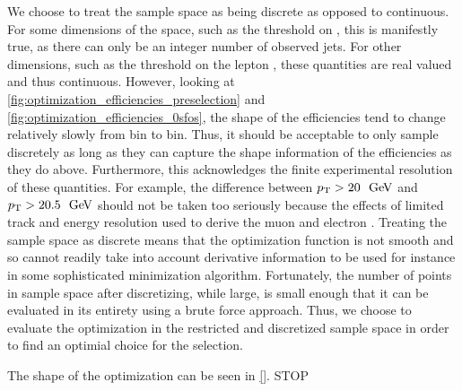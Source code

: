 We choose to treat the sample space as being discrete as opposed
to continuous. For some dimensions of the space, such as 
the threshold on \njet, this is manifestly true, as there 
can only be an integer number of observed jets. 
For other dimensions, such as the threshold on the lepton
\pt, these quantities are real valued and thus continuous.
However, looking at \fig\ref{fig:optimization_efficiencies_preselection} 
and \fig\ref{fig:optimization_efficiencies_0sfos}, the shape
of the efficiencies tend to change relatively slowly from bin
to bin. Thus, it should be acceptable to only sample 
discretely as long as they can capture the shape information of 
the efficiencies as they do above. Furthermore, 
this acknowledges the finite  experimental resolution of these 
quantities. For example,
the difference between $\pt > 20~\GeV$ and $\pt > 20.5~\GeV$
should not be taken too seriously because the effects of limited
track and energy resolution used to derive the muon and electron \pt.
Treating the sample space as discrete means that the optimization
function is not smooth and so cannot readily take into account
derivative information to be used for instance 
in some sophisticated minimization algorithm.
Fortunately, the number of points in sample space after discretizing, 
while large, is small enough that it can be evaluated in its entirety
using a brute force approach. Thus, we choose to evaluate the 
optimization in the restricted and discretized sample space in order
to find an optimial choice for the selection.


The shape of the optimization can be seen in \fig\ref{}.
STOP









